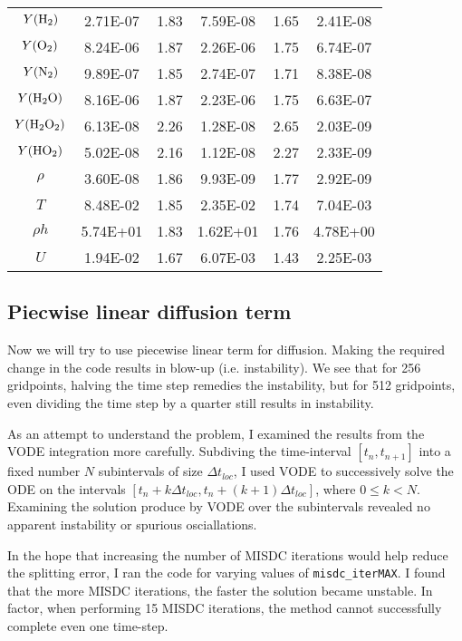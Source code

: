\documentclass[12pt]{article}
\begin{document}
\begin{center}
\begin{tabular}{ c c c c c c }
$Y({\rm H}_2)$          & 2.71E-07 & 1.83 & 7.59E-08 & 1.65 & 2.41E-08 \\
$Y({\rm O}_2)$          & 8.24E-06 & 1.87 & 2.26E-06 & 1.75 & 6.74E-07 \\
$Y({\rm N}_2)$          & 9.89E-07 & 1.85 & 2.74E-07 & 1.71 & 8.38E-08 \\
$Y({\rm H}_2{\rm O})$   & 8.16E-06 & 1.87 & 2.23E-06 & 1.75 & 6.63E-07 \\
$Y({\rm H}_2{\rm O}_2)$ & 6.13E-08 & 2.26 & 1.28E-08 & 2.65 & 2.03E-09 \\
$Y({\rm HO}_2)$         & 5.02E-08 & 2.16 & 1.12E-08 & 2.27 & 2.33E-09 \\
$\rho$                  & 3.60E-08 & 1.86 & 9.93E-09 & 1.77 & 2.92E-09 \\
$T$                     & 8.48E-02 & 1.85 & 2.35E-02 & 1.74 & 7.04E-03 \\
$\rho h$                & 5.74E+01 & 1.83 & 1.62E+01 & 1.76 & 4.78E+00 \\
$U$                     & 1.94E-02 & 1.67 & 6.07E-03 & 1.43 & 2.25E-03 \\
\end{tabular}
\end{center}

\subsection{Piecwise linear diffusion term}
Now we will try to use piecewise linear term for diffusion. Making the required 
change in the code results in blow-up (i.e. instability). We see that for 256 
gridpoints, halving the time step remedies the instability, but for 512 
gridpoints, even dividing the time step by a quarter still results in 
instability.

As an attempt to understand the problem, I examined the results from the VODE 
integration more carefully. Subdiving the time-interval $[t_n, t_{n+1}]$ into a 
fixed number $N$ subintervals of size $\Delta t_{loc}$, I used VODE to 
successively solve the ODE on the intervals $[t_n + k\Delta t_{loc}, t_n + 
(k+1)\Delta t_{loc}]$, where $0 \leq k < N$. Examining the solution produce by 
VODE over the subintervals revealed no apparent instability or spurious 
osciallations.

In the hope that increasing the number of MISDC iterations would help reduce 
the splitting error, I ran the code for varying values of 
\texttt{misdc\_iterMAX}. I found that the more MISDC iterations, the faster the 
solution became unstable. In factor, when performing 15 MISDC iterations, the 
method cannot successfully complete even one time-step.
\end{document}
